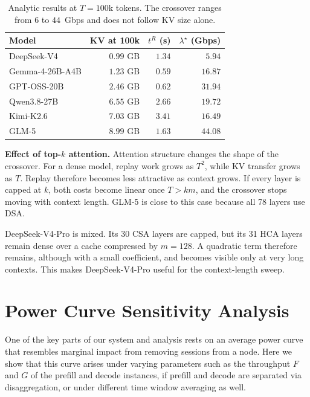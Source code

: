 \begin{table}[t]
\centering
\begin{tabular}{lrrr}
\toprule
Model & KV at 100k & \(t^{R}\) (s) & \(\lambda^\star\) (Gbps) \\
\midrule
DeepSeek-V4     & \(0.99\) GB  & \(1.34\) & \(5.94\) \\
Gemma-4-26B-A4B & \(1.23\) GB  & \(0.59\) & \(16.87\) \\
GPT-OSS-20B     & \(2.46\) GB  & \(0.62\) & \(31.94\) \\
Qwen3.8-27B     & \(6.55\) GB  & \(2.66\) & \(19.72\) \\
Kimi-K2.6           & \(7.03\) GB  & \(3.41\) & \(16.49\) \\
GLM-5               & \(8.99\) GB  & \(1.63\) & \(44.08\) \\
\bottomrule
\end{tabular}
\caption{Analytic results at \(T=100\)k tokens. The crossover ranges from
\(6\) to \(44\)~Gbps and does not follow KV size alone.}
\label{tab:app-crossover}
\end{table}

\noindent\textbf{Effect of top-\(k\) attention.}
Attention structure changes the shape of the crossover. For a dense model,
replay work grows as \(T^2\), while KV transfer grows as \(T\). Replay
therefore becomes less attractive as context grows. If every layer is capped
at \(k\), both costs become linear once \(T>km\), and the crossover stops
moving with context length. GLM-5 is close to this case because all 78 layers
use DSA.

DeepSeek-V4-Pro is mixed. Its 30 CSA layers are capped, but its 31 HCA layers
remain dense over a cache compressed by \(m=128\). A quadratic term therefore
remains, although with a small coefficient, and becomes visible only at very
long contexts. This makes DeepSeek-V4-Pro useful for the context-length sweep.

\section{Power Curve Sensitivity Analysis}
\label{app:power-window}
One of the key parts of our system and analysis rests on an average power curve that resembles marginal impact from removing sessions from a node. Here we show that this curve arises under varying parameters such as the throughput $F$ and $G$ of the prefill and decode instances, if prefill and decode are separated via disaggregation, or under different time window averaging as well.
